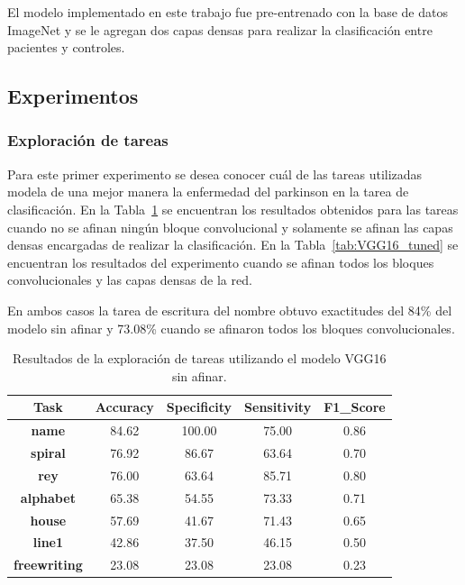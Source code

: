 \documentclass[10pt, a4paper]{article}
\begin{document}
El modelo implementado en este trabajo fue pre-entrenado con la base de datos ImageNet y se le agregan
dos capas densas para realizar la clasificación entre pacientes y controles. 


\subsection*{Experimentos}

\subsubsection*{Exploración de tareas}

Para este primer experimento se desea conocer cuál de las tareas utilizadas modela de una mejor manera
la enfermedad del parkinson en la tarea de clasificación. En la Tabla~\ref*{tab:VGG16_Freeze} se encuentran
los resultados obtenidos para las tareas cuando no se afinan ningún bloque convolucional y solamente se afinan
las capas densas encargadas de realizar la clasificación. En la Tabla~\ref*{tab:VGG16_tuned} se encuentran 
los resultados del experimento cuando se afinan todos los bloques convolucionales y las capas densas de la red.

En ambos casos la tarea de escritura del nombre obtuvo exactitudes del 84\% del modelo sin afinar y 73.08\%
cuando se afinaron todos los bloques convolucionales.


\begin{table}[h!!]
\caption{Resultados de la exploración de tareas utilizando el modelo VGG16 sin afinar.}
\centering
\label{tab:VGG16_Freeze}
\begin{tabular}{ccccc}
\hline
\textbf{Task}        & \textbf{Accuracy} & \textbf{Specificity} & \textbf{Sensitivity} & \textbf{F1\_Score} \\ \hline
\textbf{name}        & 84.62             & 100.00               & 75.00                & 0.86               \\
\textbf{spiral}      & 76.92             & 86.67                & 63.64                & 0.70               \\
\textbf{rey}         & 76.00             & 63.64                & 85.71                & 0.80               \\
\textbf{alphabet}    & 65.38             & 54.55                & 73.33                & 0.71               \\
\textbf{house}       & 57.69             & 41.67                & 71.43                & 0.65               \\
\textbf{line1}       & 42.86             & 37.50                & 46.15                & 0.50               \\
\textbf{freewriting} & 23.08             & 23.08                & 23.08                & 0.23               \\ \hline
\end{tabular}
\end{table}
\end{document}
